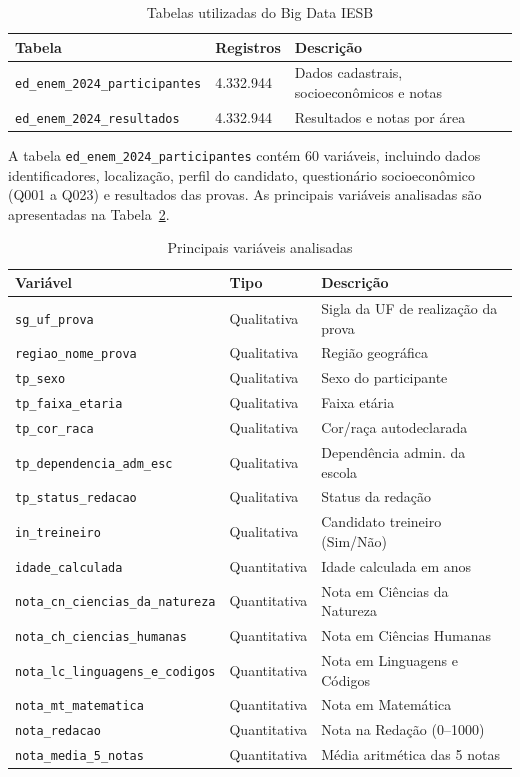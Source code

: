 \documentclass[
    12pt,
    oneside,
    a4paper,
    chapter=TITLE,
    section=TITLE
]{abntex2}
\begin{document}
\begin{table}[H]
\centering
\caption{Tabelas utilizadas do Big Data IESB}
\label{tab:tabelas}
\begin{tabular}{@{}lll@{}}
\toprule
\textbf{Tabela} & \textbf{Registros} & \textbf{Descrição} \\
\midrule
\texttt{ed\_enem\_2024\_participantes} & 4.332.944 & Dados cadastrais, socioeconômicos e notas \\
\texttt{ed\_enem\_2024\_resultados} & 4.332.944 & Resultados e notas por área \\
\bottomrule
\end{tabular}
\end{table}

A tabela \texttt{ed\_enem\_2024\_participantes} contém 60 variáveis, incluindo dados
identificadores, localização, perfil do candidato, questionário socioeconômico (Q001 a Q023)
e resultados das provas. As principais variáveis analisadas são apresentadas na
Tabela~\ref{tab:variaveis}.

\begin{table}[H]
\centering
\caption{Principais variáveis analisadas}
\label{tab:variaveis}
\begin{tabular}{@{}lll@{}}
\toprule
\textbf{Variável} & \textbf{Tipo} & \textbf{Descrição} \\
\midrule
\texttt{sg\_uf\_prova} & Qualitativa & Sigla da UF de realização da prova \\
\texttt{regiao\_nome\_prova} & Qualitativa & Região geográfica \\
\texttt{tp\_sexo} & Qualitativa & Sexo do participante \\
\texttt{tp\_faixa\_etaria} & Qualitativa & Faixa etária \\
\texttt{tp\_cor\_raca} & Qualitativa & Cor/raça autodeclarada \\
\texttt{tp\_dependencia\_adm\_esc} & Qualitativa & Dependência admin. da escola \\
\texttt{tp\_status\_redacao} & Qualitativa & Status da redação \\
\texttt{in\_treineiro} & Qualitativa & Candidato treineiro (Sim/Não) \\
\texttt{idade\_calculada} & Quantitativa & Idade calculada em anos \\
\texttt{nota\_cn\_ciencias\_da\_natureza} & Quantitativa & Nota em Ciências da Natureza \\
\texttt{nota\_ch\_ciencias\_humanas} & Quantitativa & Nota em Ciências Humanas \\
\texttt{nota\_lc\_linguagens\_e\_codigos} & Quantitativa & Nota em Linguagens e Códigos \\
\texttt{nota\_mt\_matematica} & Quantitativa & Nota em Matemática \\
\texttt{nota\_redacao} & Quantitativa & Nota na Redação (0--1000) \\
\texttt{nota\_media\_5\_notas} & Quantitativa & Média aritmética das 5 notas \\
\bottomrule
\end{tabular}
\end{table}
\end{document}
